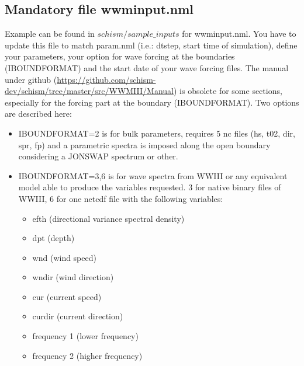 \documentclass[preprints,briefreport,accept,oneauthor,pdftex]{Definitions/mdpi}
\begin{document}
\subsection{Mandatory file wwminput.nml}
\noindent Example can be found in $schism/sample\_inputs$ for wwminput.nml. You have to update this file to match param.nml (i.e.: dtstep, start time of simulation), define your parameters, your option for wave forcing at the boundaries (IBOUNDFORMAT) and the start date of your wave forcing files. The manual under github (\url{https://github.com/schism-dev/schism/tree/master/src/WWMIII/Manual}) is obsolete for some sections, especially for the forcing part at the boundary (IBOUNDFORMAT). Two options are described here:
\begin{itemize}
    \item IBOUNDFORMAT=2 is for bulk parameters, requires 5 nc files (hs, t02, dir, spr, fp) and a parametric spectra is imposed along the open boundary considering a  JONSWAP spectrum or other.
    \item IBOUNDFORMAT=3,6 is for wave spectra from WWIII or any equivalent model able to produce the variables requested. 3 for native binary files of WWIII, 6 for one netcdf file with the following variables: 
    \begin{itemize}
    \item efth (directional variance spectral density) 
    \item dpt (depth)
    \item wnd (wind speed)
     \item wndir (wind direction)
     \item cur (current speed)
     \item curdir (current direction)
     \item frequency 1 (lower frequency)
     \item frequency 2 (higher frequency)
     \end{itemize}
\end{itemize}
\end{document}
